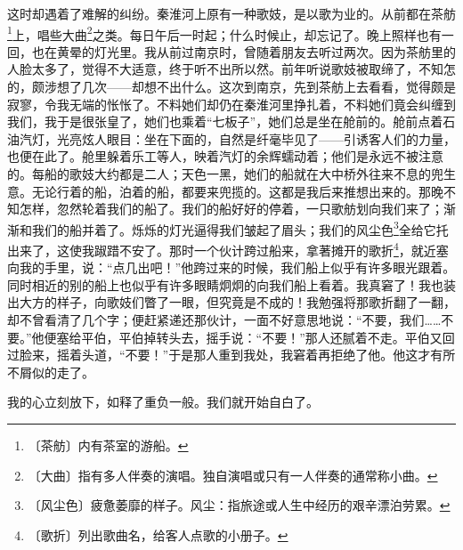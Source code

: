 \documentclass[12pt,UTF-8,openany]{ctexbook}
\begin{document}
\begin{large}
    这时却遇着了难解的纠纷。秦淮河上原有一种歌妓，是以歌为业的。从前都在茶舫\footnote{〔茶舫〕内有茶室的游船。}上，唱些大曲\footnote{〔大曲〕指有多人伴奏的演唱。独自演唱或只有一人伴奏的通常称小曲。}之类。每日午后一时起；什么时候止，却忘记了。晚上照样也有一回，也在黄晕的灯光里。我从前过南京时，曾随着朋友去听过两次。因为茶舫里的人脸太多了，觉得不大适意，终于听不出所以然。前年听说歌妓被取缔了，不知怎的，颇涉想了几次——却想不出什么。这次到南京，先到茶舫上去看看，觉得颇是寂寥，令我无端的怅怅了。不料她们却仍在秦淮河里挣扎着，不料她们竟会纠缠到我们，我于是很张皇了，她们也乘着“七板子”，她们总是坐在舱前的。舱前点着石油汽灯，光亮炫人眼目：坐在下面的，自然是纤毫毕见了——引诱客人们的力量，也便在此了。舱里躲着乐工等人，映着汽灯的余辉蠕动着；他们是永远不被注意的。每船的歌妓大约都是二人；天色一黑，她们的船就在大中桥外往来不息的兜生意。无论行着的船，泊着的船，都要来兜揽的。这都是我后来推想出来的。那晚不知怎样，忽然轮着我们的船了。我们的船好好的停着，一只歌舫划向我们来了；渐渐和我们的船并着了。烁烁的灯光逼得我们皱起了眉头；我们的风尘色\footnote{〔风尘色〕疲惫萎靡的样子。风尘：指旅途或人生中经历的艰辛漂泊劳累。}全给它托出来了，这使我踧踖不安了。那时一个伙计跨过船来，拿著摊开的歌折\footnote{〔歌折〕列出歌曲名，给客人点歌的小册子。}，就近塞向我的手里，说：“点几出吧！”他跨过来的时候，我们船上似乎有许多眼光跟着。同时相近的别的船上也似乎有许多眼睛炯炯的向我们船上看着。我真窘了！我也装出大方的样子，向歌妓们瞥了一眼，但究竟是不成的！我勉强将那歌折翻了一翻，却不曾看清了几个字；便赶紧递还那伙计，一面不好意思地说：“不要，我们……不要。”他便塞给平伯，平伯掉转头去，摇手说：“不要！”那人还腻着不走。平伯又回过脸来，摇着头道，“不要！”于是那人重到我处，我窘着再拒绝了他。他这才有所不屑似的走了。
    
    我的心立刻放下，如释了重负一般。我们就开始自白了。
    

\end{large}
\end{document}
